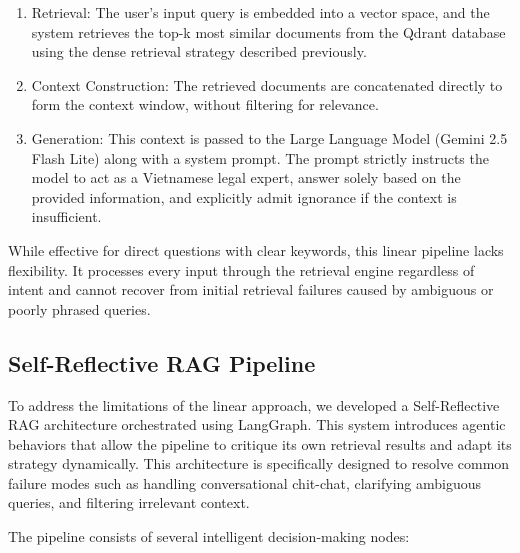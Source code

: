 \documentclass[letterpaper]{article} %
\begin{document}
\begin{enumerate}
    \item Retrieval: The user's input query is embedded into a vector space, and the system retrieves the top-k most similar documents from the Qdrant database using the dense retrieval strategy described previously.
    \item Context Construction: The retrieved documents are concatenated directly to form the context window, without filtering for relevance.
    \item Generation: This context is passed to the Large Language Model (Gemini 2.5 Flash Lite) along with a system prompt. The prompt strictly instructs the model to act as a Vietnamese legal expert, answer solely based on the provided information, and explicitly admit ignorance if the context is insufficient.
\end{enumerate}

While effective for direct questions with clear keywords, this linear pipeline lacks flexibility. It processes every input through the retrieval engine regardless of intent and cannot recover from initial retrieval failures caused by ambiguous or poorly phrased queries.

\subsection{Self-Reflective RAG Pipeline}

To address the limitations of the linear approach, we developed a Self-Reflective RAG architecture orchestrated using LangGraph. This system introduces agentic behaviors that allow the pipeline to critique its own retrieval results and adapt its strategy dynamically. This architecture is specifically designed to resolve common failure modes such as handling conversational chit-chat, clarifying ambiguous queries, and filtering irrelevant context.

The pipeline consists of several intelligent decision-making nodes:
\end{document}
